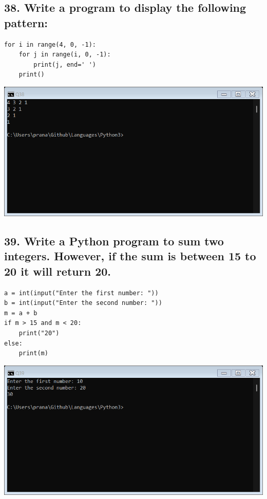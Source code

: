 \documentclass[12pt]{article}
\begin{document}
\subsection*{38. Write a program to display the following pattern:}
\begin{verbatim}
for i in range(4, 0, -1):
    for j in range(i, 0, -1):
        print(j, end=' ')
    print()
\end{verbatim}
\includegraphics[width=\linewidth]{images/38.png}

\subsection*{39. Write a Python program to sum two integers. However, if the sum is between 15 to 20 it will return 20.}
\begin{verbatim}
a = int(input("Enter the first number: "))
b = int(input("Enter the second number: "))
m = a + b
if m > 15 and m < 20:
    print("20")
else:
    print(m)
\end{verbatim}
\includegraphics[width=\linewidth]{images/39.png}
\end{document}
